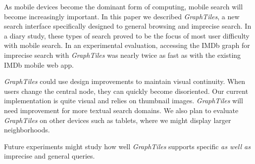 As mobile devices become the dominant form of computing, mobile search will become increasingly important. In this paper we described \textit{GraphTiles}, a new search interface specifically designed to general browsing and imprecise search. In a diary study, these types of search proved to be the focus of most user difficulty with mobile search. In an experimental evaluation, accessing the IMDb graph for imprecise search with \textit{GraphTiles} was nearly twice as fast as with the existing IMDb mobile web app.

\textit{GraphTiles} could use design improvements to maintain visual continuity. When users change the central node, they can quickly become disoriented. Our current implementation is quite visual and relies on thumbnail images. \textit{GraphTiles} will need improvement for more textual search domains. We also plan to evaluate \textit{GraphTiles} on other devices such as tablets, where we might display larger neighborhoods. 

Future experiments might study how well \textit{GraphTiles} supports specific \textit{as well as} imprecise and general queries.  

